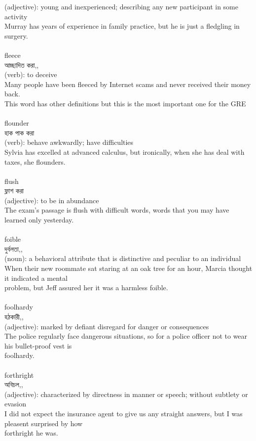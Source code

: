 \documentclass{article}
\begin{document}
{(adjective): young and inexperienced; describing any new participant in some activity\\Murray has years of experience in family practice, but he is just a fledgling in surgery.\\}\\
{fleece}\\
{আচ্ছাদিত করা,,}\\
{(verb): to deceive\\Many people have been fleeced by Internet scams and never received their money back.\\This word has other definitions but this is the most important one for the GRE\\}\\
{flounder}\\
{হাক পাক করা}\\
{(verb): behave awkwardly; have difficulties\\Sylvia has excelled at advanced calculus, but ironically, when she has deal with taxes, she flounders.\\}\\
{flush}\\
{ফ্লাশ করা}\\
{(adjective): to be in abundance\\The exam's passage is flush with difficult words, words that you may have learned only yesterday.\\}\\
{foible}\\
{দুর্বলতা,,}\\
{(noun): a behavioral attribute that is distinctive and peculiar to an individual\\When their new roommate sat staring at an oak tree for an hour, Marcia thought it indicated a mental\\problem, but Jeff assured her it was a harmless foible.\\}\\
{foolhardy}\\
{হঠকারী,,}\\
{(adjective): marked by defiant disregard for danger or consequences\\The police regularly face dangerous situations, so for a police officer not to wear his bullet-proof vest is\\foolhardy.\\}\\
{forthright}\\
{অবিচল,,}\\
{(adjective): characterized by directness in manner or speech; without subtlety or evasion\\I did not expect the insurance agent to give us any straight answers, but I was pleasent surprised by how\\forthright he was.\\}\\
\end{document}
